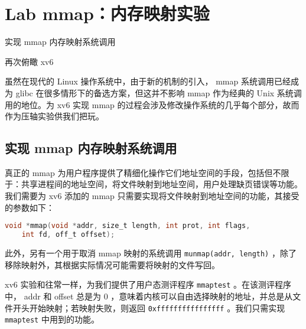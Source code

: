 \chapter{Lab mmap：内存映射实验}
\begin{introduction}
    \item 实现 mmap 内存映射系统调用
    \item 再次俯瞰 xv6
\end{introduction}

虽然在现代的 Linux 操作系统中，由于新的机制的引入， mmap 系统调用已经成为 glibc 在很多情形下的备选方案，但这并不影响 mmap 作为经典的 Unix 系统调用的地位。为 xv6 实现 mmap 的过程会涉及修改操作系统的几乎每个部分，故而作为压轴实验供我们把玩。

\section{实现 mmap 内存映射系统调用}

真正的 mmap 为用户程序提供了精细化操作它们地址空间的手段，包括但不限于：共享进程间的地址空间，将文件映射到地址空间，用户处理缺页错误等功能。我们需要为 xv6 添加的 mmap 只需要实现将文件映射到地址空间的功能，其接受的参数如下：
\begin{lstlisting}[language=C]
void *mmap(void *addr, size_t length, int prot, int flags,
    int fd, off_t offset);
\end{lstlisting}

此外，另有一个用于取消 mmap 映射的系统调用 \lstinline{munmap(addr, length)} ，除了移除映射外，其根据实际情况可能需要将映射的文件写回。

xv6 实验和往常一样，为我们提供了用户态测评程序 \lstinline{mmaptest} 。在该测评程序中， addr 和 offset 总是为 0 ，意味着内核可以自由选择映射的地址，并总是从文件开头开始映射；若映射失败，则返回 \lstinline{0xffffffffffffffff} 。我们只需实现 \lstinline{mmaptest} 中用到的功能。

